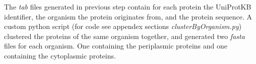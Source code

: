 The \textit{tab} files generated in previous step contain for each protein 
the UniProtKB identifier,
the organism the protein originates from,
and the protein sequence.
A custom python script (for code see appendex sections \textit{clusterByOrganism.py}) clustered the proteins of the same organism together, 
and generated two \textit{fasta} files for each organism.
One containing the periplasmic proteins and one containing the cytoplasmic proteins.
